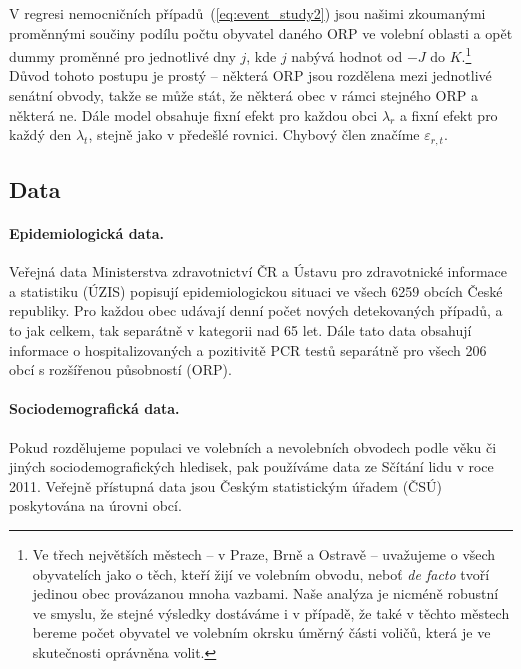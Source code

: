 V regresi nemocničních případů~(\ref{eq:event_study2}) jsou našimi zkoumanými proměnnými součiny podílu počtu obyvatel daného ORP ve volební oblasti a opět dummy proměnné pro jednotlivé dny $j$, kde $j$ nabývá hodnot od $-J$ do $K$.\footnote{Ve třech největších městech -- v Praze, Brně a Ostravě -- uvažujeme o všech obyvatelích jako o těch, kteří žijí ve volebním obvodu, neboť \textit{de facto} tvoří jedinou obec provázanou mnoha vazbami. Naše analýza je nicméně robustní ve smyslu, že stejné výsledky dostáváme i v případě, že také v těchto městech bereme počet obyvatel ve volebním okrsku úměrný části voličů, která je ve skutečnosti oprávněna volit.} Důvod tohoto postupu je prostý -- některá ORP jsou rozdělena mezi jednotlivé senátní obvody, takže se může stát, že některá obec v rámci stejného ORP  a některá ne. Dále model obsahuje fixní efekt pro každou obci $\lambda_{r}$ a fixní efekt pro každý den $\lambda_{t}$, stejně jako v předešlé rovnici. Chybový člen značíme $\varepsilon_{r,t}$.

\subsection*{Data}
\paragraph{Epidemiologická data.}  Veřejná data Ministerstva zdravotnictví ČR a Ústavu pro zdravotnické informace a statistiku (ÚZIS) popisují epidemiologickou situaci ve všech 6259 obcích České republiky. Pro každou obec udávají denní počet nových detekovaných případů, a to jak celkem, tak separátně v kategorii nad 65 let. Dále tato data obsahují informace o hospitalizovaných a pozitivitě PCR testů separátně pro všech 206 obcí s rozšířenou působností (ORP). 

\paragraph{Sociodemografická data.} 
Pokud rozdělujeme populaci ve volebních a nevolebních obvodech podle věku či jiných sociodemografických hledisek, pak používáme data ze Sčítání lidu v roce 2011. Veřejně přístupná data jsou Českým statistickým úřadem (ČSÚ) poskytována na úrovni obcí.

